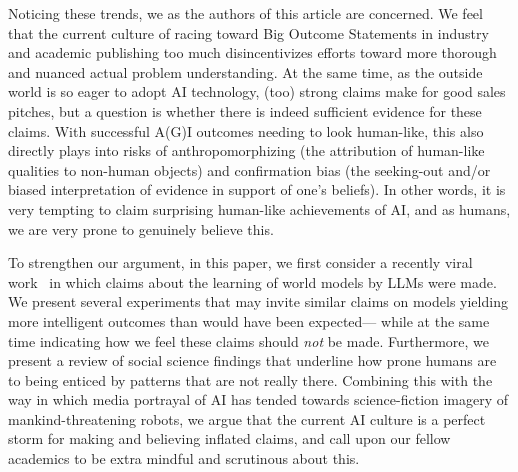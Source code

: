 \documentclass{article}
\theoremstyle{plain}
\theoremstyle{definition}
\theoremstyle{remark}
\begin{document}
Noticing these trends, we as the authors of this article are concerned. We feel that the current culture of racing toward Big Outcome Statements in industry and academic publishing too much disincentivizes efforts toward more thorough and nuanced actual problem understanding. At the same time, as the outside world is so eager to adopt AI technology, (too) strong claims make for good sales pitches, but a question is whether there is indeed sufficient evidence for these claims. With successful A(G)I outcomes needing to look human-like, this also directly plays into risks of anthropomorphizing (the attribution of human-like qualities to non-human objects) and confirmation bias (the seeking-out and/or biased interpretation of evidence in support of one's beliefs). In other words, it is very tempting to claim surprising human-like achievements of AI, and as humans, we are very prone to genuinely believe this.

To strengthen our argument, in this paper, we first consider a recently viral work~\cite{gurnee2023languagev2} in which claims about the learning of world models by LLMs were made. We present several experiments that may invite similar claims on models yielding more intelligent outcomes than would have been expected---
while at the same time indicating how we feel these claims should \emph{not} be made. Furthermore, we present a review of social science findings that underline how prone humans are to being enticed by patterns that are not really there. Combining this with the way in which media portrayal of AI has tended towards science-fiction imagery of mankind-threatening robots, we argue that the current AI culture is a perfect storm for making and believing inflated claims, and call upon our fellow academics to be extra mindful and scrutinous about this.

\end{document}
